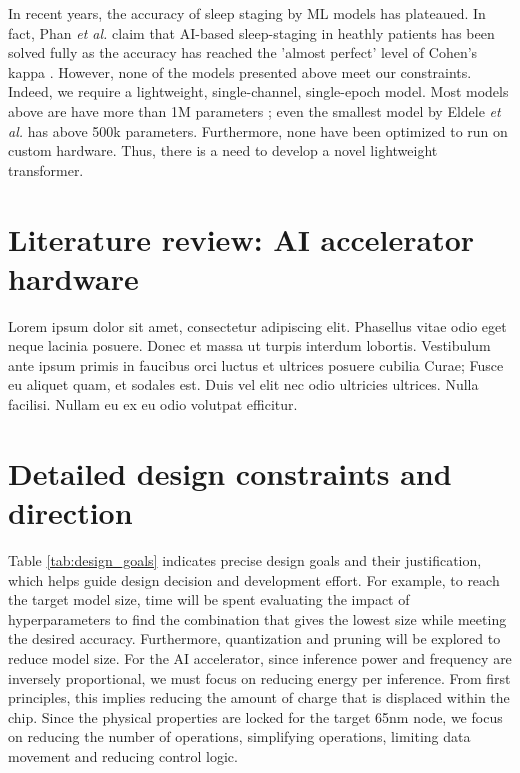 \documentclass[12pt]{article}
\begin{document}
    In recent years, the accuracy of sleep staging by ML models has plateaued. In fact, Phan \textit{et al.} claim that AI-based sleep-staging in heathly patients has been solved fully as the accuracy has reached the 'almost perfect' level of Cohen's kappa \cite{phan2022automatic}. However, none of the models presented above meet
    our constraints. Indeed, we require a lightweight, single-channel, single-epoch model. Most models above are have more than 1M parameters \cite{phan2022sleeptransformer}; even the smallest model by Eldele \textit{et al.} has above 500k parameters. Furthermore, none have been optimized to run on custom hardware. Thus, there is a need to develop a novel
    lightweight transformer.

    \section{Literature review: AI accelerator hardware}
    Lorem ipsum dolor sit amet, consectetur adipiscing elit. Phasellus vitae odio eget neque lacinia posuere. Donec et massa ut turpis interdum lobortis. Vestibulum ante ipsum primis in faucibus orci luctus et ultrices posuere cubilia Curae; Fusce eu aliquet quam, et sodales est. Duis vel elit nec odio ultricies ultrices. Nulla facilisi. Nullam eu ex eu odio volutpat efficitur.

    \section{Detailed design constraints and direction}
    Table \ref{tab:design_goals} indicates precise design goals and their justification, which helps guide design decision and development effort. For example, to reach the target model size, time will be spent evaluating
    the impact of hyperparameters to find the combination that gives the lowest size while meeting the desired accuracy. Furthermore, quantization and pruning will be explored to reduce model size. For the AI accelerator, 
    since inference power and frequency are inversely proportional, we must focus on reducing energy per inference. From first principles, this implies reducing the amount of charge that is displaced within the chip. Since
    the physical properties are locked for the target 65nm node, we focus on reducing the number of operations, simplifying operations, limiting data movement and reducing control logic.
\end{document}
